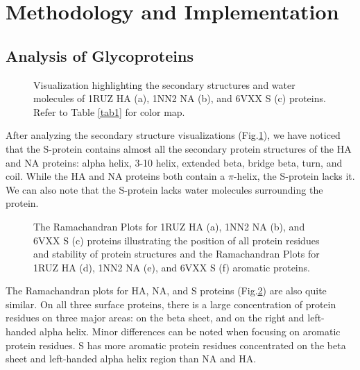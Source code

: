 \documentclass[conference]{IEEEtran}
\begin{document}
\section{Methodology and Implementation}
\subsection{Analysis of Glycoproteins}
\begin{figure}[htbp]
    \centering
\caption{Visualization highlighting the secondary structures and water molecules of 1RUZ HA (a), 1NN2 NA (b), and 6VXX S (c) proteins. Refer to Table \ref{tab1} for color map.}
\label{fig:glyco_points}
\end{figure}

After analyzing the secondary structure visualizations (Fig.\ref{fig:glyco_points}), we have noticed that the S-protein contains almost all the secondary protein structures of the HA and NA proteins: alpha helix, 3-10 helix, extended beta, bridge beta, turn, and coil. While the HA and NA proteins both contain a $\pi$-helix, the S-protein lacks it. We can also note that the S-protein lacks water molecules surrounding the protein.  

\begin{figure}
    \centering
    \caption{The Ramachandran Plots for 1RUZ HA (a), 1NN2 NA (b), and 6VXX S (c) proteins illustrating the position of all protein residues and stability of protein structures and the Ramachandran Plots for 1RUZ HA (d), 1NN2 NA (e), and 6VXX S (f) aromatic proteins. }
    \label{fig:glycoplot}
\end{figure}

The Ramachandran plots for HA, NA, and S proteins (Fig.\ref{fig:glycoplot}) are also quite similar. On all three surface proteins, there is a large concentration of protein residues on three major areas: on the beta sheet, and on the right and left-handed alpha helix. Minor differences can be noted when focusing on aromatic protein residues. S has more aromatic protein residues concentrated on the beta sheet and left-handed alpha helix region than NA and HA. 
\end{document}
